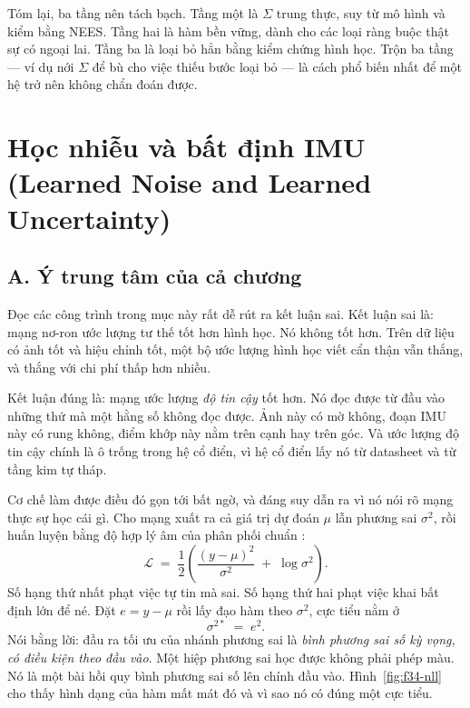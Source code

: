 \documentclass[../../deep_learning.tex]{subfiles}
\begin{document}
Tóm lại, ba tầng nên tách bạch. Tầng một là \(\Sigma\) trung thực, suy từ mô hình và kiểm bằng NEES. Tầng hai là hàm bền vững, dành cho các loại ràng buộc thật sự có ngoại lai. Tầng ba là loại bỏ hẳn bằng kiểm chứng hình học. Trộn ba tầng --- ví dụ nới \(\Sigma\) để bù cho việc thiếu bước loại bỏ --- là cách phổ biến nhất để một hệ trở nên không chẩn đoán được.

\section{Học nhiễu và bất định IMU (Learned Noise and Learned Uncertainty)}

\subsection{A. Ý trung tâm của cả chương}

Đọc các công trình trong mục này rất dễ rút ra kết luận sai. Kết luận sai là: mạng nơ-ron ước lượng tư thế tốt hơn hình học. Nó không tốt hơn. Trên dữ liệu có ảnh tốt và hiệu chỉnh tốt, một bộ ước lượng hình học viết cẩn thận vẫn thắng, và thắng với chi phí thấp hơn nhiều.

Kết luận đúng là: mạng ước lượng \emph{độ tin cậy} tốt hơn. Nó đọc được từ đầu vào những thứ mà một hằng số không đọc được. Ảnh này có mờ không, đoạn IMU này có rung không, điểm khớp này nằm trên cạnh hay trên góc. Và ước lượng độ tin cậy chính là ô trống trong hệ cổ điển, vì hệ cổ điển lấy nó từ datasheet và từ tầng kim tự tháp.

Cơ chế làm được điều đó gọn tới bất ngờ, và đáng suy dẫn ra vì nó nói rõ mạng thực sự học cái gì. Cho mạng xuất ra cả giá trị dự đoán \(\mu\) lẫn phương sai \(\sigma^2\), rồi huấn luyện bằng độ hợp lý âm của phân phối chuẩn \cite{nix1994estimating}:
\[
\mathcal{L} \;=\; \frac{1}{2}\left(\frac{(y-\mu)^2}{\sigma^2} \;+\; \log \sigma^2\right).
\]
Số hạng thứ nhất phạt việc tự tin mà sai. Số hạng thứ hai phạt việc khai bất định lớn để né. Đặt \(e = y-\mu\) rồi lấy đạo hàm theo \(\sigma^2\), cực tiểu nằm ở
\[
\sigma^{2\ast} \;=\; e^{2}.
\]
Nói bằng lời: đầu ra tối ưu của nhánh phương sai là \emph{bình phương sai số kỳ vọng, có điều kiện theo đầu vào}. Một hiệp phương sai học được không phải phép màu. Nó là một bài hồi quy bình phương sai số lên chính đầu vào. Hình~\ref{fig:f34-nll} cho thấy hình dạng của hàm mất mát đó và vì sao nó có đúng một cực tiểu.
\end{document}
